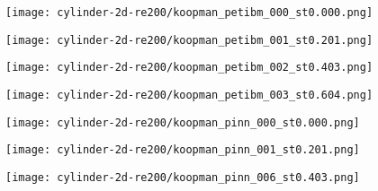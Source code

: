 
\begin{figure*}[!hbt]
    \centering%
    \texttt{[image: cylinder-2d-re200/koopman\_petibm\_000\_st0.000.png]}%
    \caption{%
        The \num{1}st mode in PetIBM.
    }
    \label{fig:cylinder-re200-koopman-petibm-1st}%
\end{figure*}

\begin{figure*}[!hbt]
    \centering%
    \texttt{[image: cylinder-2d-re200/koopman\_petibm\_001\_st0.201.png]}%
    \caption{%
        The \num{2}nd mode in PetIBM.
    }
    \label{fig:cylinder-re200-koopman-petibm-2nd}%
\end{figure*}

\begin{figure*}[!hbt]
    \centering%
    \texttt{[image: cylinder-2d-re200/koopman\_petibm\_002\_st0.403.png]}%
    \caption{%
        The \num{3}rd mode in PetIBM.
    }
    \label{fig:cylinder-re200-koopman-petibm-3rd}%
\end{figure*}

\begin{figure*}[!hbt]
    \centering%
    \texttt{[image: cylinder-2d-re200/koopman\_petibm\_003\_st0.604.png]}%
    \caption{%
        The \num{4}th mode in PetIBM.
    }
    \label{fig:cylinder-re200-koopman-petibm-4th}%
\end{figure*}

\begin{figure*}[!hbt]
    \centering%
    \texttt{[image: cylinder-2d-re200/koopman\_pinn\_000\_st0.000.png]}%
    \caption{%
        The \num{1}st primary mode in data-driven PINN.
    }
    \label{fig:cylinder-re200-koopman-pinn-primary-1st}%
\end{figure*}

\begin{figure*}[!hbt]
    \centering%
    \texttt{[image: cylinder-2d-re200/koopman\_pinn\_001\_st0.201.png]}%
    \caption{%
        The \num{2}nd primary mode in data-driven PINN.
    }
    \label{fig:cylinder-re200-koopman-pinn-primary-2nd}%
\end{figure*}

\begin{figure*}[!hbt]
    \centering%
    \texttt{[image: cylinder-2d-re200/koopman\_pinn\_006\_st0.403.png]}%
    \caption{%
        The \num{3}rd primary mode in data-driven PINN.
    }
    \label{fig:cylinder-re200-koopman-pinn-primary-3rd}%
\end{figure*}

